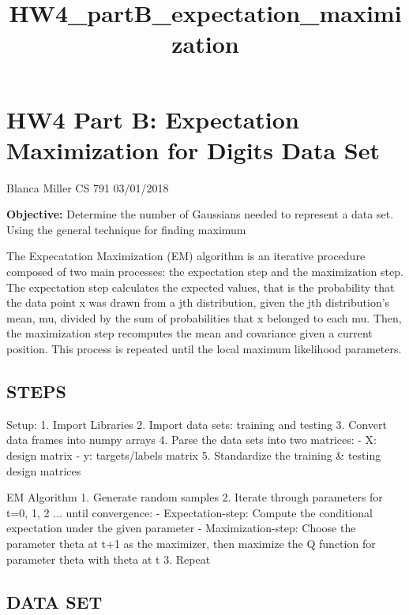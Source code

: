 \documentclass[11pt]{article}
\title{HW4\_partB\_expectation\_maximization}
\begin{document}
    
    
    \maketitle
    
    

    
    \section{HW4 Part B: Expectation Maximization for Digits Data
Set}\label{hw4-part-b-expectation-maximization-for-digits-data-set}

    Blanca Miller CS 791 03/01/2018

\textbf{Objective:} Determine the number of Gaussians needed to
represent a data set. Using the general technique for finding maximum

The Expecatation Maximization (EM) algorithm is an iterative procedure
composed of two main processes: the expectation step and the
maximization step. The expectation step calculates the expected values,
that is the probability that the data point x was drawn from a jth
distribution, given the jth distribution's mean, mu, divided by the sum
of probabilities that x belonged to each mu. Then, the maximization step
recomputes the mean and covariance given a current position. This
process is repeated until the local maximum likelihood parameters.

    \subsection{STEPS}\label{steps}

Setup: 1. Import Libraries 2. Import data sets: training and testing 3.
Convert data frames into numpy arrays 4. Parse the data sets into two
matrices: - X: design matrix - y: targets/labels matrix 5. Standardize
the training \& testing design matrices

EM Algorithm 1. Generate random samples 2. Iterate through parameters
for t=0, 1, 2 ... until convergence: - Expectation-step: Compute the
conditional expectation under the given parameter - Maximization-step:
Choose the parameter theta at t+1 as the maximizer, then maximize the Q
function for parameter theta with theta at t 3. Repeat

    \subsection{DATA SET}\label{data-set}
\end{document}

